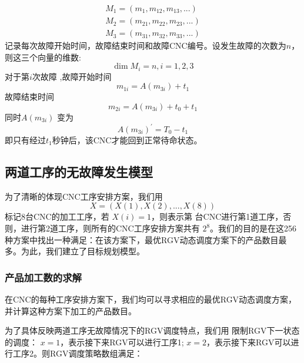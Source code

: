 \documentclass[withoutpreface,bwprint]{cumcmthesis} %
\begin{document}
\begin{equation}
\begin{array}{l}
{M_1} = ({m_{1}},{m_{12}},{m_{13}},...)\\
{M_2} = ({m_{21}},{m_{22}},{m_{23}},...)\\
{M_3} = ({m_{31}},{m_{32}},{m_{33}},...)
\end{array}
\end{equation}
记录每次故障开始时间，故障结束时间和故障CNC编号。设发生故障的次数为${n}$，则这三个向量的维数:
\begin{equation}
\dim {M_i} = n,i = 1,2,3
\end{equation}
对于第${i}$次故障
,故障开始时间\begin{equation}{m_{1i}} = A({m_{3i}}) + {t_1}\end{equation}
故障结束时间\begin{equation}{m_{2i}} = A({m_{3i}}) + {t_0} + {t_1}\end{equation}
同时$
A(m_{3i})
$
变为
\begin{equation}
A(m_{3i})^{'} = T_0- t_1
\end{equation}
即只有经过${t_1}$秒钟后，该CNC才能回到正常待命状态。







\subsection{两道工序的无故障发生模型}
为了清晰的体现CNC工序安排方案，我们用 \begin{equation}X = (X(1),X(2),...,X(8))\end{equation}标记8台CNC的加工工序，若 $X(i) = 1$，则表示第 台CNC进行第1道工序，否则，进行第2道工序，则所有的CNC工序安排方案共有 $2^8$。我们的目的是在这256种方案中找出一种满足：在该方案下，最优RGV动态调度方案下的产品数目最多。为此，我们建立了目标规划模型。

\subsubsection{产品加工数的求解}
在CNC的每种工序安排方案下，我们均可以寻求相应的最优RGV动态调度方案，并计算这种方案下加工的产品数目。

为了具体反映两道工序无故障情况下的RGV调度特点，我们用 限制RGV下一状态的调度： $ x= 1$，表示接下来RGV可以进行工序1;  $ x= 2$，表示接下来RGV可以进行工序2。则RGV调度策略数组满足：
\end{document}
